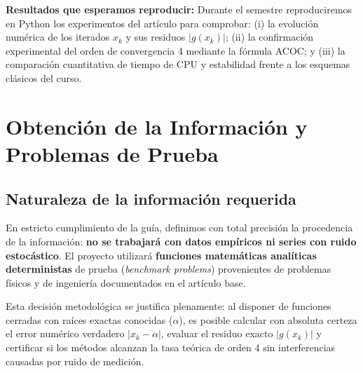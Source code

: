 ﻿\documentclass[10pt, a4paper]{article}
\begin{document}
\textbf{Resultados que esperamos reproducir:} Durante el semestre reproduciremos en Python los experimentos del artículo para comprobar: (i) la evolución numérica de los iterados $x_k$ y sus residuos $|g(x_k)|$; (ii) la confirmación experimental del orden de convergencia 4 mediante la fórmula ACOC; y (iii) la comparación cuantitativa de tiempo de CPU y estabilidad frente a los esquemas clásicos del curso.

\section{Obtención de la Información y Problemas de Prueba}

\subsection{Naturaleza de la información requerida}
En estricto cumplimiento de la guía, definimos con total precisión la procedencia de la información: \textbf{no se trabajará con datos empíricos ni series con ruido estocástico}. El proyecto utilizará \textbf{funciones matemáticas analíticas deterministas} de prueba (\textit{benchmark problems}) provenientes de problemas físicos y de ingeniería documentados en el artículo base. 

Esta decisión metodológica se justifica plenamente: al disponer de funciones cerradas con raíces exactas conocidas ($\alpha$), es posible calcular con absoluta certeza el error numérico verdadero $|x_k - \alpha|$, evaluar el residuo exacto $|g(x_k)|$ y certificar si los métodos alcanzan la tasa teórica de orden 4 sin interferencias causadas por ruido de medición.
\end{document}
